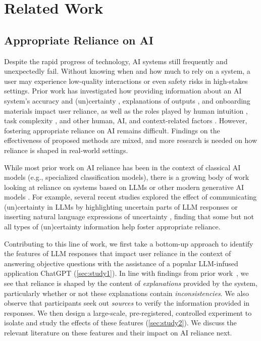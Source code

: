 \section{Related Work}
\subsection{Appropriate Reliance on AI}

Despite the rapid progress of technology, AI systems still frequently and unexpectedly fail. Without knowing when and how much to rely on a system, a user may experience low-quality interactions or even safety risks in high-stakes settings. 
Prior work has investigated how providing information about an AI system's accuracy \cite{yin2019understanding,He2023Accuracy,Yu2019IUI} and (un)certainty \cite{zhang2020effect,Bansal2021CHI,Green2019,Bucinca2021CSCW,Bussone2015}, explanations of outputs \cite{zhang2020effect,Gonzalez2021DoEH,Bansal2021CHI,Lai2019FAccT,Green2019,Bucinca2021CSCW,Bussone2015}, and onboarding materials \cite{Cai2021,Lai2020Tutorial} impact user reliance, as well as the roles played by human intuition \cite{chen2023understanding}, task complexity \cite{Salimzadeh2023UMAP,Salimzadeh2024CHI}, and other human, AI, and context-related factors \cite{Kim2023Trust}.
However, fostering appropriate reliance on AI remains difficult.
Findings on the effectiveness of proposed methods are mixed, and more research is needed on how reliance is shaped in real-world settings.

While most prior work on AI reliance has been in the context of classical AI models (e.g., specialized classification models), there is a growing body of work looking at reliance on systems based on LLMs or other modern generative AI models \cite{vasconcelos2023generation,spatharioti2023comparing,zhou2024relying,Kim2024FAccT,si2024fact,Lee2024FAccT}. 
For example, several recent studies explored the effect of communicating (un)certainty in LLMs by highlighting uncertain parts of LLM responses \cite{vasconcelos2023generation,spatharioti2023comparing} or inserting natural language expressions of uncertainty \cite{zhou2024relying,Kim2024FAccT}, finding that some but not all types of (un)certainty information help foster appropriate reliance.

Contributing to this line of work, we first take a bottom-up approach to identify the features of LLM responses that impact user reliance in the context of answering objective questions with the assistance of a popular LLM-infused application ChatGPT (\cref{sec:study1}).
In line with findings from prior work~\cite{si2024fact}, we see that reliance is shaped by the content of \textit{explanations} provided by the system, particularly whether or not these explanations contain \textit{inconsistencies}. We also observe that participants seek out \textit{sources} to verify the information provided in responses. We then design a large-scale, pre-registered, controlled experiment to isolate and study the effects of these features (\cref{sec:study2}). We discuss the relevant literature on these features and their impact on AI reliance next.


